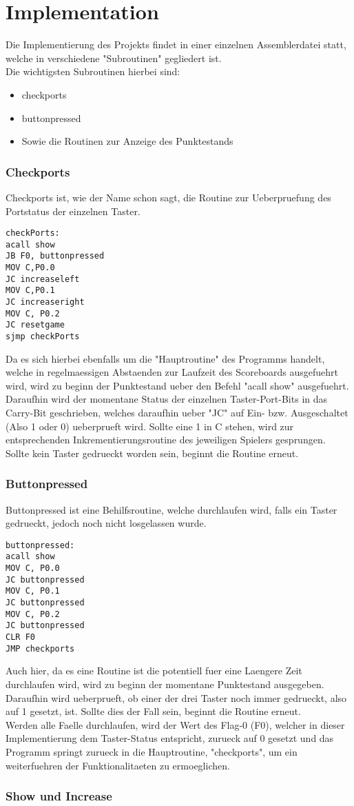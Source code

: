 \chapter{Implementation}
Die Implementierung des Projekts findet in einer einzelnen Assemblerdatei statt, welche in verschiedene "Subroutinen" gegliedert ist.\\
Die wichtigsten Subroutinen hierbei sind:
\begin{itemize}
	\item checkports
	\item buttonpressed
	\item Sowie die Routinen zur Anzeige des Punktestands
\end{itemize}

\subsection{Checkports}
Checkports ist, wie der Name schon sagt, die Routine zur Ueberpruefung des Portstatus der einzelnen Taster.
\begin{lstlisting}
checkPorts:
acall show
JB F0, buttonpressed
MOV C,P0.0
JC increaseleft
MOV C,P0.1
JC increaseright
MOV C, P0.2
JC resetgame
sjmp checkPorts
\end{lstlisting}
Da es sich hierbei ebenfalls um die "Hauptroutine" des Programms handelt, welche in regelmaessigen Abstaenden zur Laufzeit des Scoreboards ausgefuehrt wird, wird zu beginn der Punktestand ueber den Befehl "acall show" ausgefuehrt.\\
Daraufhin wird der momentane Status der einzelnen Taster-Port-Bits in das Carry-Bit geschrieben, welches daraufhin ueber "JC" auf Ein- bzw. Ausgeschaltet (Also 1 oder 0) ueberprueft wird. Sollte eine 1 in C stehen, wird zur entsprechenden Inkrementierungsroutine des jeweiligen Spielers gesprungen.\\
Sollte kein Taster gedrueckt worden sein, beginnt die Routine erneut.

\subsection{Buttonpressed}
Buttonpressed ist eine Behilfsroutine, welche durchlaufen wird, falls ein Taster gedrueckt, jedoch noch nicht losgelassen wurde.
\begin{lstlisting}
buttonpressed:
acall show
MOV C, P0.0
JC buttonpressed
MOV C, P0.1
JC buttonpressed
MOV C, P0.2
JC buttonpressed
CLR F0
JMP checkports
\end{lstlisting}
Auch hier, da es eine Routine ist die potentiell fuer eine Laengere Zeit durchlaufen wird, wird zu beginn der momentane Punktestand ausgegeben. Daraufhin wird ueberprueft, ob einer der drei Taster noch immer gedrueckt, also auf 1 gesetzt, ist. Sollte dies der Fall sein, beginnt die Routine erneut.\\
Werden alle Faelle durchlaufen, wird der Wert des Flag-0 (F0), welcher in dieser Implementierung dem Taster-Status entspricht, zurueck auf 0 gesetzt und das Programm springt zurueck in die Hauptroutine, "checkports", um ein weiterfuehren der Funktionalitaeten zu ermoeglichen.

\subsection{Show und Increase}